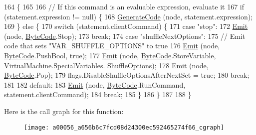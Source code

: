\begin{DoxyCode}
164                                                                      \{
165 
166             \textcolor{comment}{// If this command is an evaluable expression, evaluate it}
167             \textcolor{keywordflow}{if} (statement.expression != null) \{
168                 \hyperlink{a00056_a006f3becd521cc179ba3d3352f6f930b}{GenerateCode} (node, statement.expression);
169             \} \textcolor{keywordflow}{else} \{
170                 \textcolor{keywordflow}{switch} (statement.clientCommand) \{
171                 \textcolor{keywordflow}{case} \textcolor{stringliteral}{"stop"}:
172                     \hyperlink{a00056_a774e8c143cdda0584fcfdda98626a83c}{Emit} (node, \hyperlink{a00053_ad5dfb6ee68ca7469623ad3e459f98894}{ByteCode}.Stop);
173                     \textcolor{keywordflow}{break};
174                 \textcolor{keywordflow}{case} \textcolor{stringliteral}{"shuffleNextOptions"}:
175                     \textcolor{comment}{// Emit code that sets "VAR\_SHUFFLE\_OPTIONS" to true}
176                     \hyperlink{a00056_a774e8c143cdda0584fcfdda98626a83c}{Emit} (node, \hyperlink{a00053_ad5dfb6ee68ca7469623ad3e459f98894}{ByteCode}.PushBool, \textcolor{keyword}{true});
177                     \hyperlink{a00056_a774e8c143cdda0584fcfdda98626a83c}{Emit} (node, \hyperlink{a00053_ad5dfb6ee68ca7469623ad3e459f98894}{ByteCode}.StoreVariable, VirtualMachine.SpecialVariables.
      ShuffleOptions);
178                     \hyperlink{a00056_a774e8c143cdda0584fcfdda98626a83c}{Emit} (node, \hyperlink{a00053_ad5dfb6ee68ca7469623ad3e459f98894}{ByteCode}.Pop);
179                     flags.DisableShuffleOptionsAfterNextSet = \textcolor{keyword}{true};
180                     \textcolor{keywordflow}{break};
181 
182                 \textcolor{keywordflow}{default}:
183                     \hyperlink{a00056_a774e8c143cdda0584fcfdda98626a83c}{Emit} (node, \hyperlink{a00053_ad5dfb6ee68ca7469623ad3e459f98894}{ByteCode}.RunCommand, statement.clientCommand);
184                     \textcolor{keywordflow}{break};
185                 \}
186             \}
187 
188         \}
\end{DoxyCode}


Here is the call graph for this function\-:
\nopagebreak
\begin{figure}[H]
\begin{center}
\leavevmode
\texttt{[image: a00056\_a656b6c7fcd08d24300ec592465274f66\_cgraph]}
\end{center}
\end{figure}


